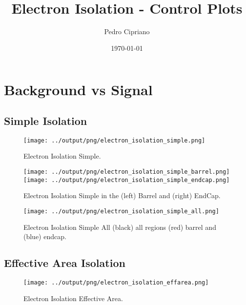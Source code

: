 \documentclass[11pt]{book}
\begin{document}
         
 
 \author{Pedro Cipriano}
 \date{\today}
 \title{Electron Isolation - Control Plots}

\maketitle

\tableofcontents

\chapter{Background vs Signal}

\section{Simple Isolation}

\begin{figure}[ht]
\centering
\texttt{[image: ../output/png/electron\_isolation\_simple.png]}
\caption{Electron Isolation Simple.}
\label{fig:electron_isolation_simple}
\end{figure}

\begin{figure}[ht]
\centering
\texttt{[image: ../output/png/electron\_isolation\_simple\_barrel.png]}
\texttt{[image: ../output/png/electron\_isolation\_simple\_endcap.png]}
\caption{Electron Isolation Simple in the (left) Barrel and (right) EndCap.}
\label{fig:electron_isolation_simple_regions}
\end{figure}

\begin{figure}[ht]
\centering
\texttt{[image: ../output/png/electron\_isolation\_simple\_all.png]}
\caption{Electron Isolation Simple All (black) all regions (red) barrel and (blue) endcap.}
\label{fig:electron_isolation_simple_all}
\end{figure}

\clearpage


\section{Effective Area Isolation}

\begin{figure}[ht]
\centering
\texttt{[image: ../output/png/electron\_isolation\_effarea.png]}
\caption{Electron Isolation Effective Area.}
\label{fig:electron_isolation_effarea}
\end{figure}
\end{document}

